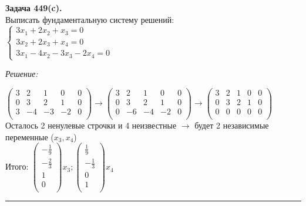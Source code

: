 \documentclass[a4paper, 12pt]{article}
\newenvironment{problem}[2][Задача]
{ \begin{mdframed}[backgroundcolor=gray!10] \textbf{#1 #2.} \\}
{  \end{mdframed}}
\newenvironment{solution}
{\textit{Решение: }}
{\noindent\rule{7in}{1.5pt}}
\begin{document}
\begin{problem}{449(c)}
  Выписать фундаментальную систему решений:\\
  $\left\{\begin{array}{l}
      3x_1+2x_2+x_3=0\\
      3x_2+2x_3+x_4=0\\
      3x_1-4x_2-3x_3-2x_4=0
  \end{array}\right.$

\end{problem}
\begin{solution}

  $
  \left(
    \begin{array}{rrrrrrrr}
      3 &  2 &  1 &  0 & 0\\
      0 &  3 &  2 &  1 & 0\\
      3 & -4 & -3 & -2 & 0\\
    \end{array}
  \right)
  \rightarrow
  \left(
    \begin{array}{rrrrrrrr}
      3 &  2 &  1 &  0 & 0\\
      0 &  3 &  2 &  1 & 0\\
      0 & -6 & -4 & -2 & 0\\
    \end{array}
  \right)
  \rightarrow
  \left(
    \begin{array}{rrrrrrrr}
      3 & 2 & 1 & 0 & 0\\
      0 & 3 & 2 & 1 & 0\\
      0 & 0 & 0 & 0 & 0\\
    \end{array}
  \right)
  $
  \\
  Осталось 2 ненулевые строчки и 4 неизвестные $\rightarrow$ будет 2 независимые переменные ($x_3, x_4$) \\
  Итого:
  $
  \left(
    \begin{array}{r}
      -\frac{1}{9} \\
      -\frac{2}{3} \\
      1 \\
      0 \\
    \end{array}
  \right)
  x_3 ;
  \left(
    \begin{array}{r}
      \frac{1}{9} \\
      -\frac{1}{3} \\
      0 \\
      1 \\
    \end{array}
  \right)
  x_4
  $

\end{solution}
\end{document}
